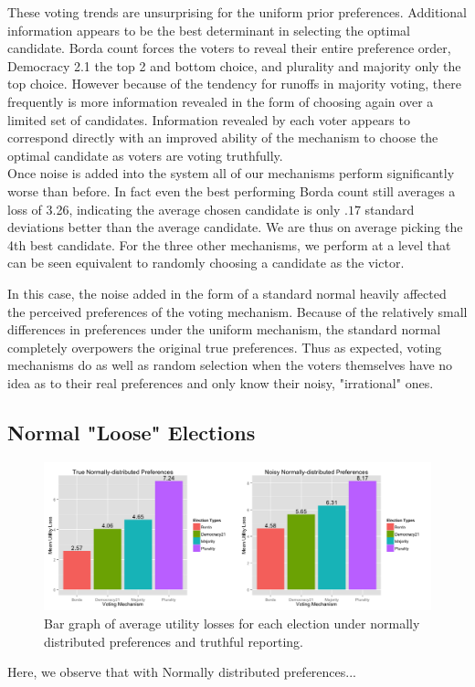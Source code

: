 \documentclass[11pt]{scrartcl}
\begin{document}
These voting trends are unsurprising for the uniform prior preferences. Additional information appears to be the best determinant in selecting the optimal candidate. Borda count forces the voters to reveal their entire preference order, Democracy 2.1 the top 2 and bottom choice, and plurality and majority only the top choice. However because of the tendency for runoffs in majority voting, there frequently is more information revealed in the form of choosing again over a limited set of candidates. Information revealed by each voter appears to correspond directly with an improved ability of the mechanism to choose the optimal candidate as voters are voting truthfully.\\

Once noise is added into the system all of our mechanisms perform significantly worse than before. In fact even the best performing Borda count still averages a loss of 3.26, indicating the average chosen candidate is only $.17$ standard deviations better than the average candidate. We are thus on average picking the 4th best candidate. For the three other mechanisms, we perform at a level that can be seen equivalent to randomly choosing a candidate as the victor.

In this case, the noise added in the form of a standard normal heavily affected the perceived preferences of the voting mechanism. Because of the relatively small differences in preferences under the uniform mechanism, the standard normal completely overpowers the original true preferences. Thus as expected, voting mechanisms do as well as random selection when the voters themselves have no idea as to their real preferences and only know their noisy, "irrational" ones.


\subsection{Normal "Loose" Elections}
\begin{figure}[H]\center
\includegraphics[scale=0.38]{normal.png}
\caption{Bar graph of average utility losses for each election under normally distributed preferences and truthful reporting.}
\end{figure}
Here, we observe that with Normally distributed preferences...
\end{document}
